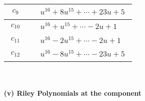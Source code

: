 \documentclass[1p]{elsarticle_modified}
\theoremstyle{definition}
\begin{document}
\begin{tabular}{m{50pt}|m{274pt}}
\hline $$\begin{aligned}c_{9}\end{aligned}$$&$\begin{aligned}
&u^{16}+8 u^{15}+\cdots+23 u+5
\end{aligned}$\\
\hline $$\begin{aligned}c_{10}\end{aligned}$$&$\begin{aligned}
&u^{16}+u^{15}+\cdots-2 u+1
\end{aligned}$\\
\hline $$\begin{aligned}c_{11}\end{aligned}$$&$\begin{aligned}
&u^{16}-2 u^{15}+\cdots-2 u+1
\end{aligned}$\\
\hline $$\begin{aligned}c_{12}\end{aligned}$$&$\begin{aligned}
&u^{16}-8 u^{15}+\cdots-23 u+5
\end{aligned}$\\
\hline
\end{tabular}\\~\\
\newpage\renewcommand{\arraystretch}{1}
\flushleft \textbf{(v) Riley Polynomials at the component}\newline \\
\end{document}

